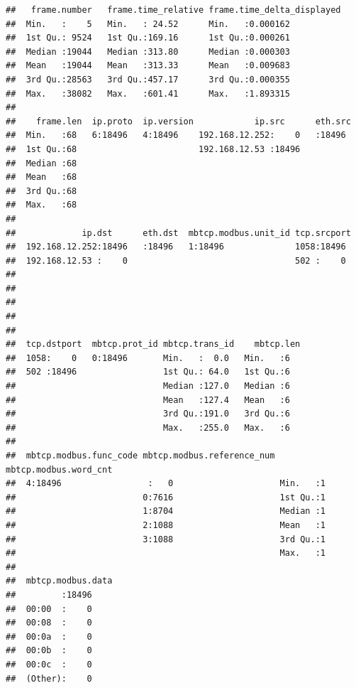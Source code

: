 \documentclass[]{article}
\begin{document}
\begin{verbatim}
##   frame.number   frame.time_relative frame.time_delta_displayed
##  Min.   :    5   Min.   : 24.52      Min.   :0.000162          
##  1st Qu.: 9524   1st Qu.:169.16      1st Qu.:0.000261          
##  Median :19044   Median :313.80      Median :0.000303          
##  Mean   :19044   Mean   :313.33      Mean   :0.009683          
##  3rd Qu.:28563   3rd Qu.:457.17      3rd Qu.:0.000355          
##  Max.   :38082   Max.   :601.41      Max.   :1.893315          
##                                                                
##    frame.len  ip.proto  ip.version            ip.src      eth.src 
##  Min.   :68   6:18496   4:18496    192.168.12.252:    0   :18496  
##  1st Qu.:68                        192.168.12.53 :18496           
##  Median :68                                                       
##  Mean   :68                                                       
##  3rd Qu.:68                                                       
##  Max.   :68                                                       
##                                                                   
##             ip.dst      eth.dst  mbtcp.modbus.unit_id tcp.srcport 
##  192.168.12.252:18496   :18496   1:18496              1058:18496  
##  192.168.12.53 :    0                                 502 :    0  
##                                                                   
##                                                                   
##                                                                   
##                                                                   
##                                                                   
##  tcp.dstport  mbtcp.prot_id mbtcp.trans_id    mbtcp.len
##  1058:    0   0:18496       Min.   :  0.0   Min.   :6  
##  502 :18496                 1st Qu.: 64.0   1st Qu.:6  
##                             Median :127.0   Median :6  
##                             Mean   :127.4   Mean   :6  
##                             3rd Qu.:191.0   3rd Qu.:6  
##                             Max.   :255.0   Max.   :6  
##                                                        
##  mbtcp.modbus.func_code mbtcp.modbus.reference_num mbtcp.modbus.word_cnt
##  4:18496                 :   0                     Min.   :1            
##                         0:7616                     1st Qu.:1            
##                         1:8704                     Median :1            
##                         2:1088                     Mean   :1            
##                         3:1088                     3rd Qu.:1            
##                                                    Max.   :1            
##                                                                         
##  mbtcp.modbus.data
##         :18496    
##  00:00  :    0    
##  00:08  :    0    
##  00:0a  :    0    
##  00:0b  :    0    
##  00:0c  :    0    
##  (Other):    0
\end{verbatim}
\end{document}

